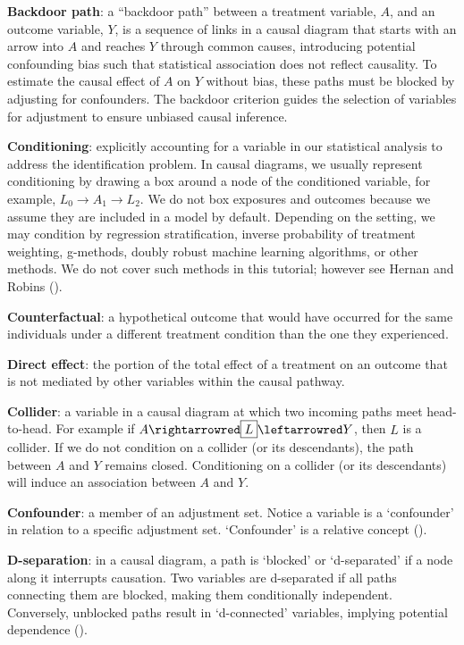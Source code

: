 \documentclass[
  singlecolumn]{article}
\begin{document}
\textbf{Backdoor path}: a ``backdoor path'' between a treatment
variable, \(A\), and an outcome variable, \(Y\), is a sequence of links
in a causal diagram that starts with an arrow into \(A\) and reaches
\(Y\) through common causes, introducing potential confounding bias such
that statistical association does not reflect causality. To estimate the
causal effect of \(A\) on \(Y\) without bias, these paths must be
blocked by adjusting for confounders. The backdoor criterion guides the
selection of variables for adjustment to ensure unbiased causal
inference.

\textbf{Conditioning}: explicitly accounting for a variable in our
statistical analysis to address the identification problem. In causal
diagrams, we usually represent conditioning by drawing a box around a
node of the conditioned variable, for example,
\(\boxed{L_{0}}\to A_{1} \to L_{2}\). We do not box exposures and
outcomes because we assume they are included in a model by default.
Depending on the setting, we may condition by regression stratification,
inverse probability of treatment weighting, g-methods, doubly robust
machine learning algorithms, or other methods. We do not cover such
methods in this tutorial; however see Hernan and Robins
().

\textbf{Counterfactual}: a hypothetical outcome that would have occurred
for the same individuals under a different treatment condition than the
one they experienced.

\textbf{Direct effect}: the portion of the total effect of a treatment
on an outcome that is not mediated by other variables within the causal
pathway.

\textbf{Collider}: a variable in a causal diagram at which two incoming
paths meet head-to-head. For example if
\(A \rightarrowred \boxed{L} \leftarrowred Y\), then \(L\) is a
collider. If we do not condition on a collider (or its descendants), the
path between \(A\) and \(Y\) remains closed. Conditioning on a collider
(or its descendants) will induce an association between \(A\) and \(Y\).

\textbf{Confounder}: a member of an adjustment set. Notice a variable is
a `confounder' in relation to a specific adjustment set. `Confounder' is
a relative concept ().

\textbf{D-separation}: in a causal diagram, a path is `blocked' or
`d-separated' if a node along it interrupts causation. Two variables are
d-separated if all paths connecting them are blocked, making them
conditionally independent. Conversely, unblocked paths result in
`d-connected' variables, implying potential dependence
().
\end{document}
